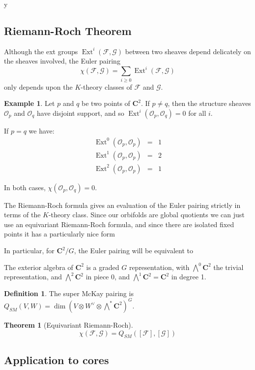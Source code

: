 y\documentclass{amsart}[12pt]
\theoremstyle{definition}
\newtheorem{theorem}[dummy]{Theorem}
\newtheorem{example}[dummy]{Example}
\newtheorem{definition}[dummy]{Definition}
\newcommand{\C}{\mathbf{C}}
\DeclareMathOperator{\Ext}{Ext}
\begin{document}
\subsection{Riemann-Roch Theorem}
Although the ext groups $\Ext^i(\mathcal{F},\mathcal{G})$ between two sheaves depend delicately on the sheaves involved, the Euler pairing
$$\chi(\mathcal{F},\mathcal{G})=\sum_{i\geq 0} \Ext^i(\mathcal{F},\mathcal{G})$$
only depends upon the $K$-theory classes of $\mathcal{F}$ and $\mathcal{G}$.  

\begin{example}
Let $p$ and $q$ be two points of $\C^2$.  If $p\neq q$, then the structure sheaves $\mathcal{O}_p$ and $\mathcal{O}_q$ have disjoint support, and so $\Ext^i(\mathcal{O}_p,\mathcal{O}_q)=0$ for all $i$.

If $p=q$ we have:
\begin{eqnarray*}
\Ext^0(\mathcal{O}_p,\mathcal{O}_p)&=&1\\
\Ext^1(\mathcal{O}_p,\mathcal{O}_p)&=&2\\
\Ext^2(\mathcal{O}_p,\mathcal{O}_p)&=&1 
\end{eqnarray*}

In both cases, $\chi(\mathcal{O}_p,\mathcal{O}_q)=0$.
\end{example}

The Riemann-Roch formula gives an evaluation of the Euler pairing strictly in terms of the $K$-theory class.  Since our orbifolds are global quotients we can just use an equivariant Riemann-Roch formula, and since there are isolated fixed points it has a particularly nice form

In particular, for $\C^2/G$, the Euler pairing will be equivalent to 

The exterior algebra of $\C^2$ is a graded $G$ representation, with $\bigwedge^0\C^2$ the trivial representation, and $\bigwedge^2\C^2$ in piece 0, and $\bigwedge^1\C^2=\C^2$ in degree 1.  

\begin{definition}
The super McKay pairing is $Q_{SM}(V,W)=\dim (V\otimes W^\vee\otimes\bigwedge^*\C^2)^G$.
\end{definition}


\begin{theorem}[Equivariant Riemann-Roch]
$$\chi(\mathcal{F},\mathcal{G})=Q_{SM}([\mathcal{F}],[\mathcal{G}])$$
\end{theorem}


\subsection{Application to cores}
\end{document}
